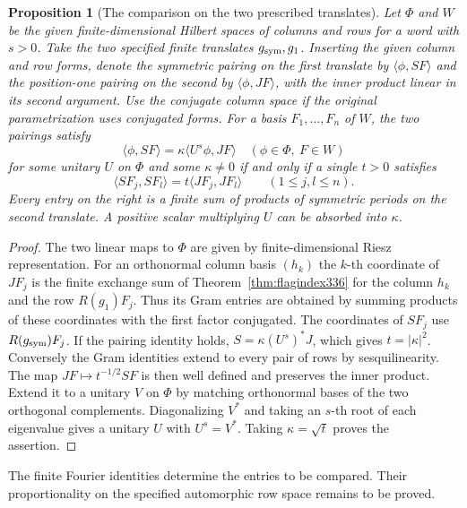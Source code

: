 \documentclass[a4paper,11pt]{article}
\newtheorem{proposition}{Proposition}[section]
\theoremstyle{definition}
\theoremstyle{remark}
\numberwithin{equation}{section}
\begin{document}
\begin{proposition}[The comparison on the two prescribed translates]\label{prop:exchangegram336}
Let \(\Phi\) and \(W\) be the given finite-dimensional Hilbert
spaces of columns and rows for a word with \(s>0\). Take the two
specified finite translates \(g_{\rm sym},g_1\). Inserting the
given column and row forms, denote the symmetric pairing on the
first translate by \(\langle\phi,SF\rangle\) and the position-one
pairing on the second by \(\langle\phi,JF\rangle\), with the
inner product linear in its second argument. Use the conjugate
column space if the original parametrization uses conjugated
forms. For a basis \(F_1,\ldots,F_n\) of \(W\), the two pairings
satisfy
\[
 \langle\phi,SF\rangle=\kappa\langle U^s\phi,JF\rangle
                 \quad(\phi\in\Phi,\ F\in W)
\]
for some unitary \(U\) on \(\Phi\) and some \(\kappa\ne0\) if
and only if a single \(t>0\) satisfies
\[
       \langle SF_j,SF_l\rangle=t\langle JF_j,JF_l\rangle
                        \qquad(1\le j,l\le n).
\]
Every entry on the right is a finite sum of products of symmetric
periods on the second translate. A positive scalar multiplying
\(U\) can be absorbed into \(\kappa\).
\end{proposition}
\begin{proof}
The two linear maps to \(\Phi\) are given by finite-dimensional
Riesz representation. For an orthonormal column basis \((h_k)\)
the \(k\)-th coordinate of \(JF_j\) is the finite exchange sum
of Theorem~\ref{thm:flagindex336} for the column \(h_k\) and the
row \(R(g_1)F_j\). Thus its Gram entries are obtained by summing
products of these coordinates with the first factor conjugated.
The coordinates of \(SF_j\) use \(R(g_{\rm sym})F_j\).
If the pairing identity holds, \(S=\kappa(U^s)^*J\), which
gives \(t=|\kappa|^2\). Conversely the Gram identities extend
to every pair of rows by sesquilinearity. The map
\(JF\mapsto t^{-1/2}SF\) is then well defined and preserves the
inner product. Extend it to a unitary \(V\) on \(\Phi\) by
matching orthonormal bases of the two orthogonal complements.
Diagonalizing \(V^*\) and taking an \(s\)-th root of each
eigenvalue gives a unitary \(U\) with \(U^s=V^*\). Taking
\(\kappa=\sqrt t\) proves the assertion.
\end{proof}
The finite Fourier identities determine the entries to be compared.
Their proportionality on the specified automorphic row space
remains to be proved.
\end{document}
